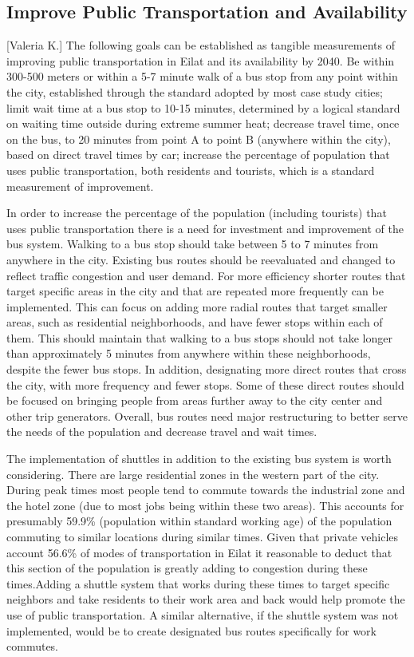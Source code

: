 \documentclass[12pt]{article}                               %
\begin{document}
\subsection{Improve Public Transportation and Availability}[Valeria K.] \label{sec:disc_improve_transport}
The following goals can be established as tangible measurements of improving public transportation in Eilat and its availability by 2040. Be within 300-500 meters or within a 5-7 minute walk of a bus stop from any point within the city, established through the standard adopted by most case study cities; limit wait time at a bus stop to 10-15 minutes, determined by a logical standard on waiting time outside during extreme summer heat; decrease travel time, once on the bus, to 20 minutes from point A to point B (anywhere within the city), based on direct travel times by car; increase the percentage of population that uses public transportation, both residents and tourists, which is a standard measurement of improvement. 

In order to increase the percentage of the population (including tourists) that uses public transportation there is a need for investment and improvement of the bus system. Walking to a bus stop should take between 5 to 7 minutes from anywhere in the city. Existing bus routes should be reevaluated and changed to reflect traffic congestion and user demand. For more efficiency shorter routes that target specific areas in the city and that are repeated more frequently can be implemented. This can focus on adding more radial routes that target smaller areas, such as residential neighborhoods, and have fewer stops within each of them. This should maintain that walking to a bus stops should not take longer than approximately 5 minutes from anywhere within these neighborhoods, despite the fewer bus stops. In addition, designating more direct routes that cross the city, with more frequency and fewer stops. Some of these direct routes should be focused on bringing people from areas further away to the city center and other trip generators. Overall, bus routes need major restructuring to better serve the needs of the population and decrease travel and wait times. 

The implementation of shuttles in addition to the existing bus system is worth considering. There are large residential zones in the western part of the city. During peak times most people tend to commute towards the industrial zone and the hotel zone (due to most jobs being within these two areas). This accounts for presumably 59.9\% (population within standard working age) of the population commuting to similar locations during similar times. Given that private vehicles account 56.6\% of modes of transportation in Eilat it reasonable to deduct that this section of the population is greatly adding to congestion during these times.Adding a shuttle system that works during these times to target specific neighbors and take residents to their work area and back would help promote the use of public transportation. A similar alternative, if the shuttle system was not implemented, would be to create designated bus routes specifically for work commutes.
    
\end{document}
